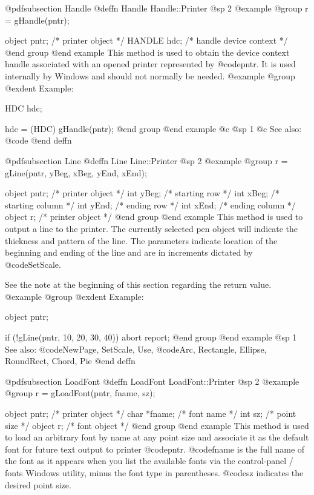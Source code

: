 @pdfsubsection {Handle}
@deffn {Handle} Handle::Printer
@sp 2
@example
@group
r = gHandle(pntr); 

object  pntr;   /*  printer object         */
HANDLE  hdc;    /*  handle device context  */
@end group
@end example
This method is used to obtain the device context handle associated with
an opened printer represented by @code{pntr}.  It is used internally
by Windows and should not normally be needed.
@example
@group
@exdent Example:

HDC     hdc;

hdc = (HDC) gHandle(pntr);
@end group
@end example
@c @sp 1
@c See also:  @code{}
@end deffn

















@pdfsubsection {Line}
@deffn {Line} Line::Printer
@sp 2
@example
@group
r = gLine(pntr, yBeg, xBeg, yEnd, xEnd);

object  pntr;   /*  printer object   */
int     yBeg;   /*  starting row     */
int     xBeg;   /*  starting column  */
int     yEnd;   /*  ending row       */
int     xEnd;   /*  ending column    */
object  r;      /*  printer object   */
@end group
@end example
This method is used to output a line to the printer.  The currently
selected pen object will indicate the thickness and pattern of the line.
The parameters indicate location of the beginning and ending of the line
and are in increments dictated by @code{SetScale}.

See the note at the beginning of this section regarding the return value.
@example
@group
@exdent Example:

object  pntr;

if (!gLine(pntr, 10, 20, 30, 40))
        abort report;
@end group
@end example
@sp 1
See also:  @code{NewPage, SetScale, Use,}
        @code{Arc, Rectangle, Ellipse, RoundRect, Chord, Pie}
@end deffn












@pdfsubsection {LoadFont}
@deffn {LoadFont} LoadFont::Printer
@sp 2
@example
@group
r = gLoadFont(pntr, fname, sz);

object   pntr;  /*  printer object   */
char    *fname; /*  font name        */
int      sz;    /*  point size       */
object   r;     /*  font object      */
@end group
@end example
This method is used to load an arbitrary font by name at any point size
and associate it as the default font for future text output to printer
@code{pntr}.  @code{fname} is the full name of the font as it appears
when you list the available fonts via the control-panel / fonts Windows
utility, minus the font type in parentheses.  @code{sz} indicates the
desired point size.

